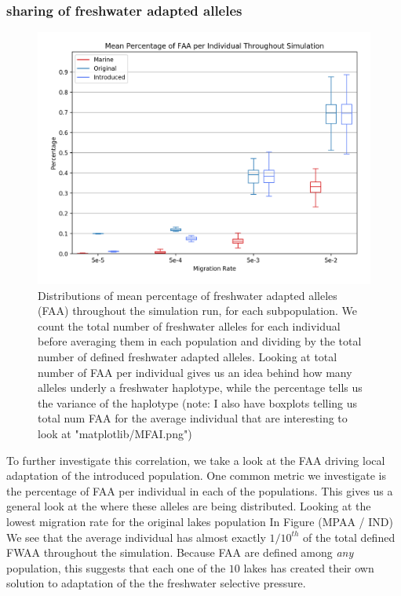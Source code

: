 \documentclass{article}
\begin{document}
 
\subsubsection*{sharing of freshwater adapted alleles}

\begin{figure}[h!tb]
	\begin{center}
  		\includegraphics[width=0.8\linewidth]{matplotlib/MPFAI.png}
  		\caption{Distributions of mean percentage of freshwater adapted alleles (FAA) throughout the simulation run, for each subpopulation.
		We count the total number of freshwater alleles for each individual before averaging them in each population and dividing by the total number of defined
		freshwater adapted alleles.
		Looking at total number of FAA per individual gives us an idea behind how many alleles underly a freshwater haplotype, 
		while the percentage tells us the variance of the haplotype (note: I also have boxplots telling us total num FAA for the average individual that are interesting to look at "matplotlib/MFAI.png")}
  		\label{fig:MPFAI}
	\end{center}
\end{figure}



To further investigate this correlation, we take a look at the FAA driving 
local adaptation of the introduced population. 
One common metric we investigate is the percentage of FAA per individual in each of the populations. 
This gives us a general look at the where these alleles are being distributed. 
Looking at the lowest migration rate for the original lakes population In Figure (MPAA / IND) 
We see that the average individual has almost exactly $1/10^{th}$ of the total defined FWAA throughout the simulation. 
Because FAA are defined among \textit{any} population, this suggests that each one of the $10$ 
lakes has created their own solution to adaptation of the the freshwater selective pressure. 
\end{document}
